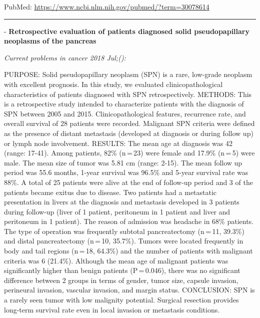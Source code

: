 \documentclass[]{article}
\begin{document}
PubMed: \url{https://www.ncbi.nlm.nih.gov/pubmed/?term=30078614}

{}

{}

\begin{center}\rule{0.5\linewidth}{\linethickness}\end{center}

 - \textbf{Retrospective evaluation of patients diagnosed solid
pseudopapillary neoplasms of the pancreas}

\emph{Current problems in cancer 2018 Jul;():}

PURPOSE: Solid pseudopapillary neoplasm (SPN) is a rare, low-grade
neoplasm with excellent prognosis. In this study, we evaluated
clinicopathological characteristics of patients diagnosed with SPN
retrospectively. METHODS: This is a retrospective study intended to
characterize patients with the diagnosis of SPN between 2005 and 2015.
Clinicopathological features, recurrence rate, and overall survival of
28 patients were recorded. Malignant SPN criteria were defined as the
presence of distant metastasis (developed at diagnosis or during follow
up) or lymph node involvement. RESULTS: The mean age at diagnosis was 42
(range: 17-41). Among patients, 82\% (n\,=\,23) were female and 17.9\%
(n\,=\,5) were male. The mean size of tumor was 5.81 cm (range: 2-15).
The mean follow up period was 55.6 months, 1-year survival was 96.5\%
and 5-year survival rate was 88\%. A total of 25 patients were alive at
the end of follow-up period and 3 of the patients became exitus due to
disease. Two patients had a metastatic presentation in livers at the
diagnosis and metastasis developed in 3 patients during follow-up (liver
of 1 patient, peritoneum in 1 patient and liver and peritoneum in 1
patient). The reason of admission was headache in 68\% patients. The
type of operation was frequently subtotal pancreatectomy (n\,=\,11,
39.3\%) and distal pancreatectomy (n\,=\,10, 35.7\%). Tumors were
located frequently in body and tail regions (n\,=\,18, 64.3\%) and the
number of patients with malignant criteria was 6 (21.4\%). Although the
mean age of malignant patients was significantly higher than benign
patients (P\,=\,0.046), there was no significant difference between 2
groups in terms of gender, tumor size, capsule invasion, perineural
invasion, vascular invasion, and margin status. CONCLUSION: SPN is a
rarely seen tumor with low malignity potential. Surgical resection
provides long-term survival rate even in local invasion or metastasis
conditions.
\end{document}
